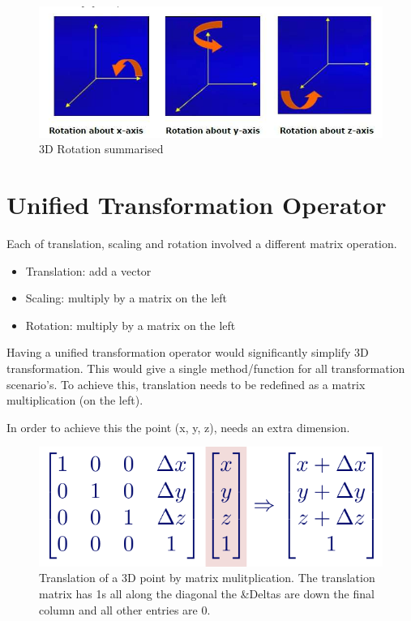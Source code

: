 \documentclass[
]{book}
\providecommand{\tightlist}{%
  \setlength{\itemsep}{0pt}\setlength{\parskip}{0pt}}
\begin{document}
\begin{figure}
\centering
\includegraphics{img/08-image17.png}
\caption{\label{fig:3d-rotation4}3D Rotation summarised}
\end{figure}

\hypertarget{unified-transformation-operator}{%
\section{Unified Transformation Operator}\label{unified-transformation-operator}}

Each of translation, scaling and rotation involved a different matrix operation.

\begin{itemize}
\tightlist
\item
  Translation: add a vector
\item
  Scaling: multiply by a matrix on the left
\item
  Rotation: multiply by a matrix on the left
\end{itemize}

Having a {unified transformation operator} would significantly simplify 3D transformation. This would give a single method/function for all transformation scenario's. To achieve this, translation needs to be redefined as a matrix multiplication (on the left).

In order to achieve this the point (x, y, z), needs an extra dimension.

\begin{figure}
\centering
\includegraphics{img/08-image18.png}
\caption{\label{fig:trans-unified-op}Translation of a 3D point by matrix mulitplication. The translation matrix has 1s all along the diagonal the \&Deltas are down the final column and all other entries are 0.}
\end{figure}
\end{document}
